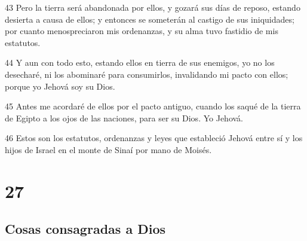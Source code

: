 \par 43 Pero la tierra será abandonada por ellos, y gozará sus días de reposo, estando desierta a causa de ellos; y entonces se someterán al castigo de sus iniquidades; por cuanto menospreciaron mis ordenanzas, y su alma tuvo fastidio de mis estatutos.
\par 44 Y aun con todo esto, estando ellos en tierra de sus enemigos, yo no los desecharé, ni los abominaré para consumirlos, invalidando mi pacto con ellos; porque yo Jehová soy su Dios.
\par 45 Antes me acordaré de ellos por el pacto antiguo, cuando los saqué de la tierra de Egipto a los ojos de las naciones, para ser su Dios. Yo Jehová.
\par 46 Estos son los estatutos, ordenanzas y leyes que estableció Jehová entre sí y los hijos de Israel en el monte de Sinaí por mano de Moisés.

\chapter{27}

\section*{Cosas consagradas a Dios}

